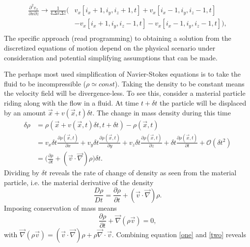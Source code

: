 \begin{equation}
	\begin{split}
		\frac{\partial^2 v_x}{\partial x\partial z} \rightarrow \frac{1}{4\Delta x \Delta z}\bigg(&v_x[i_x+1,i_y,i_z+1,t]+v_x[i_x-1,i_y,i_z-1,t]\\
		&-v_x[i_x+1,i_y,i_z-1,t]-v_x[i_x-1,i_y,i_z-1,t]\bigg),\\
	\end{split}
\end{equation}   
The specific approach (read programming) to obtaining a solution from the discretized equations of motion depend on the physical scenario under consideration and potential simplifying assumptions that can be made.

\begin{example}
	The perhaps most used simplification of Navier-Stokes equations is to take the fluid to be incompressible ($\rho\simeq const$). Taking the density to be constant means the velocity field will be divergence-less. To see this, consider a material particle riding along with the flow in a fluid. At time $t+\delta t$ the particle will be displaced by an amount $\vec{x}+v(\vec{x},t)\delta t$. The change in mass density during this time
	\begin{equation}
		\begin{split}
			\delta \rho &=\rho(\vec{x}+v(\vec{x},t)\delta t,t+\delta t)-\rho(\vec{x},t)\\
			&= v_{x}\delta t\frac{\partial \rho (\vec{x},t)}{\partial x}+v_{y}\delta t\frac{\partial \rho (\vec{x},t)}{\partial y}+v_{z}\delta t\frac{\partial \rho (\vec{x},t)}{\partial z}+\delta t\frac{\partial \rho (\vec{x},t)}{\partial t}+\mathcal{O}(\delta t^2)\\
			&=\bigg(\frac{\partial \rho}{\partial t}+(\vec{v}\cdot \vec{\nabla})\rho\bigg)\delta t.
		\end{split}
	\end{equation}
	Dividing by $\delta t$ reveals the rate of change of density as seen from the material particle, i.e. the material derivative of the density
	\begin{equation}
		\frac{D \rho}{Dt}=\frac{\partial \rho}{\partial t}+(\vec{v}\cdot \vec{\nabla})\rho.
		\label{one}
	\end{equation}
	Imposing conservation of mass means
	\begin{equation}
		\frac{\partial \rho}{\partial t}+\vec{\nabla}(\rho\vec{v})=0,
		\label{two}
	\end{equation}
	with $\vec{\nabla}(\rho\vec{v})=(\vec{v}\cdot \vec{\nabla})\rho+\rho\vec{\nabla}\cdot \vec{v}$. Combining equation \eqref{one} and \eqref{two} reveals

\end{example}
